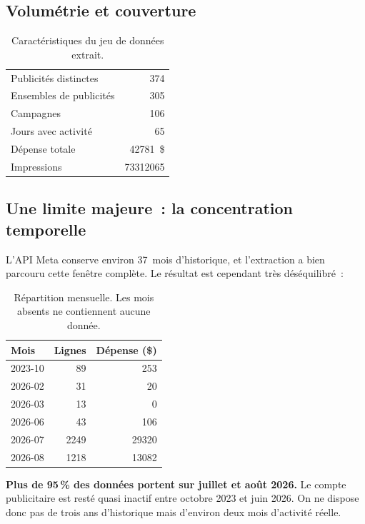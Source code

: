 \documentclass[11pt,a4paper]{article}
\begin{document}
\subsection{Volumétrie et couverture}

\begin{table}[h]
\centering
\small
\begin{tabular}{@{}lr@{}}
\toprule
Publicités distinctes & \num{374} \\
Ensembles de publicités & \num{305} \\
Campagnes & \num{106} \\
Jours avec activité & \num{65} \\
Dépense totale & \num{42781}~\$ \\
Impressions & \num{73312065} \\
\bottomrule
\end{tabular}
\caption{Caractéristiques du jeu de données extrait.}
\end{table}

\subsection{Une limite majeure~: la concentration temporelle}

L'API Meta conserve environ 37~mois d'historique, et l'extraction a bien
parcouru cette fenêtre complète. Le résultat est cependant très déséquilibré~:

\begin{table}[h]
\centering
\small
\begin{tabular}{@{}lrr@{}}
\toprule
\textbf{Mois} & \textbf{Lignes} & \textbf{Dépense (\$)} \\
\midrule
2023-10 & \num{89}   & \num{253} \\
2026-02 & \num{31}   & \num{20} \\
2026-03 & \num{13}   & \num{0} \\
2026-06 & \num{43}   & \num{106} \\
2026-07 & \num{2249} & \num{29320} \\
2026-08 & \num{1218} & \num{13082} \\
\bottomrule
\end{tabular}
\caption{Répartition mensuelle. Les mois absents ne contiennent aucune donnée.}
\end{table}

\textbf{Plus de 95\,\% des données portent sur juillet et août 2026.} Le compte
publicitaire est resté quasi inactif entre octobre 2023 et juin 2026. On ne
dispose donc pas de trois ans d'historique mais d'environ deux mois d'activité
réelle.
\end{document}

